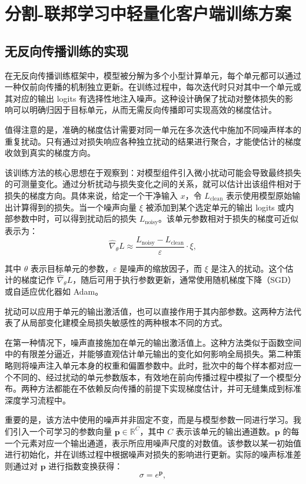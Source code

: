 \chapter{分割-联邦学习中轻量化客户端训练方案}
\section{无反向传播训练的实现}
在无反向传播训练框架中，模型被分解为多个小型计算单元，每个单元都可以通过一种仅前向传播的机制独立更新。在训练过程中，每次迭代时只对其中一个单元或其对应的输出 logits 有选择性地注入噪声。这种设计确保了扰动对整体损失的影响可以明确归因于目标单元，从而无需反向传播即可实现高效的梯度估计。

值得注意的是，准确的梯度估计需要对同一单元在多次迭代中施加不同噪声样本的重复扰动。只有通过对损失响应各种独立扰动的结果进行聚合，才能使估计的梯度收敛到真实的梯度方向。

该训练方法的核心思想在于观察到：对模型组件引入微小扰动可能会导致最终损失的可测量变化。通过分析扰动与损失变化之间的关系，就可以估计出该组件相对于损失的梯度方向。具体来说，给定一个干净输入 $ x $，令 $ L_{\text{clean}} $ 表示使用模型原始输出计算得到的损失。当一个噪声向量 $ \xi $ 被添加到某个选定单元的输出 logits 或内部参数中时，可以得到扰动后的损失 $ L_{\text{noisy}} $。该单元参数相对于损失的梯度可近似表示为：
\begin{equation}
    \hat{\nabla}_{\theta} L \approx \frac{L_{\text{noisy}} - L_{\text{clean}}}{\varepsilon} \cdot \xi,
\end{equation}

其中 $ \theta $ 表示目标单元的参数，$ \varepsilon $ 是噪声的缩放因子，而 $ \xi $ 是注入的扰动。这个估计的梯度记作 $ \hat{\nabla}_{\theta} L $，随后可用于执行参数更新，通常使用随机梯度下降（SGD）或自适应优化器如 Adam。

扰动可以应用于单元的输出激活值，也可以直接作用于其内部参数。这两种方法代表了从局部变化建模全局损失敏感性的两种根本不同的方式。

在第一种情况下，噪声直接施加在单元的输出激活值上。这种方法类似于函数空间中的有限差分逼近，并能够直观估计单元输出的变化如何影响全局损失。第二种策略则将噪声注入单元本身的权重和偏置参数中。此时，批次中的每个样本都对应一个不同的、经过扰动的单元参数版本，有效地在前向传播过程中模拟了一个模型分布。两种方法都能在不依赖反向传播的前提下实现梯度估计，并可无缝集成到标准深度学习流程中。

重要的是，该方法中使用的噪声并非固定不变，而是与模型参数一同进行学习。我们引入一个可学习的参数向量 $\mathbf{p} \in \mathbb{R}^{C}$，其中 $ C $ 表示该单元的输出通道数。$\mathbf{p}$ 的每一个元素对应一个输出通道，表示所应用噪声尺度的对数值。该参数以某一初始值进行初始化，并在训练过程中根据噪声对损失的影响进行更新。实际的噪声标准差则通过对 $\mathbf{p}$ 进行指数变换获得：
\begin{equation}
   \sigma = e^{\mathbf{p}},
\end{equation}

